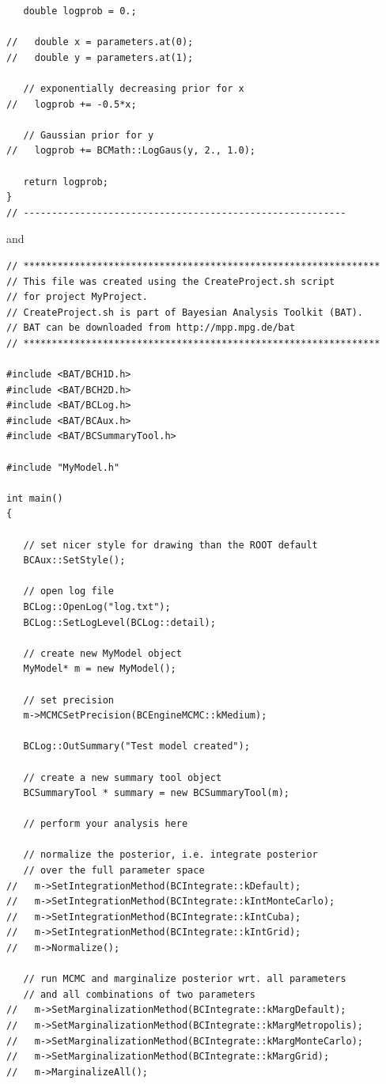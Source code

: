 \documentclass[11pt, a4paper]{article}
\begin{document}
\begin{verbatim}
   double logprob = 0.;

//   double x = parameters.at(0);
//   double y = parameters.at(1);

   // exponentially decreasing prior for x
//   logprob += -0.5*x;

   // Gaussian prior for y
//   logprob += BCMath::LogGaus(y, 2., 1.0);

   return logprob;
}
// ---------------------------------------------------------
\end{verbatim}

and

\begin{verbatim}
// ***************************************************************
// This file was created using the CreateProject.sh script
// for project MyProject.
// CreateProject.sh is part of Bayesian Analysis Toolkit (BAT).
// BAT can be downloaded from http://mpp.mpg.de/bat
// ***************************************************************

#include <BAT/BCH1D.h>
#include <BAT/BCH2D.h>
#include <BAT/BCLog.h>
#include <BAT/BCAux.h>
#include <BAT/BCSummaryTool.h>

#include "MyModel.h"

int main()
{

   // set nicer style for drawing than the ROOT default
   BCAux::SetStyle();

   // open log file
   BCLog::OpenLog("log.txt");
   BCLog::SetLogLevel(BCLog::detail);

   // create new MyModel object
   MyModel* m = new MyModel();

   // set precision
   m->MCMCSetPrecision(BCEngineMCMC::kMedium);

   BCLog::OutSummary("Test model created");

   // create a new summary tool object
   BCSummaryTool * summary = new BCSummaryTool(m);

   // perform your analysis here

   // normalize the posterior, i.e. integrate posterior
   // over the full parameter space
//   m->SetIntegrationMethod(BCIntegrate::kDefault);
//   m->SetIntegrationMethod(BCIntegrate::kIntMonteCarlo);
//   m->SetIntegrationMethod(BCIntegrate::kIntCuba);
//   m->SetIntegrationMethod(BCIntegrate::kIntGrid);
//   m->Normalize();

   // run MCMC and marginalize posterior wrt. all parameters
   // and all combinations of two parameters
//   m->SetMarginalizationMethod(BCIntegrate::kMargDefault);
//   m->SetMarginalizationMethod(BCIntegrate::kMargMetropolis);
//   m->SetMarginalizationMethod(BCIntegrate::kMargMonteCarlo);
//   m->SetMarginalizationMethod(BCIntegrate::kMargGrid);
//   m->MarginalizeAll();


\end{verbatim}
\end{document}
